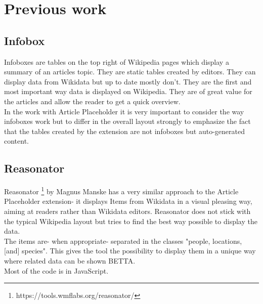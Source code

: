 \section{Previous work}
\subsection{Infobox}
Infoboxes are tables on the top right of Wikipedia pages which display a summary of an articles topic. They are static tables created by editors. They can display data from Wikidata but up to date mostly don't. They are the first and most important way data is displayed on Wikipedia. They are of great value for the articles and allow the reader to get a quick overview. \\
In the work with Article Placeholder it is very important to consider the way infoboxes work but to differ in the overall layout strongly to emphasize the fact that the tables created by the extension are not infoboxes but auto-generated content. 

\subsection{Reasonator}
Reasonator \footnote{https://tools.wmflabs.org/reasonator/} by Magnus Manske has a very similar approach to the Article Placeholder extension- it displays Items from Wikidata in a visual pleasing way, aiming at readers rather than Wikidata editors. Reasonator does not stick with the typical Wikipedia layout but tries to find the best way possible to display the data. \\
The items are- when appropriate- separated in the classes   "people, locations, [and] species".  This gives the tool the possibility to display them in a unique way where related data can be shown BETTA. \\
Most of the code is in JavaScript. 

